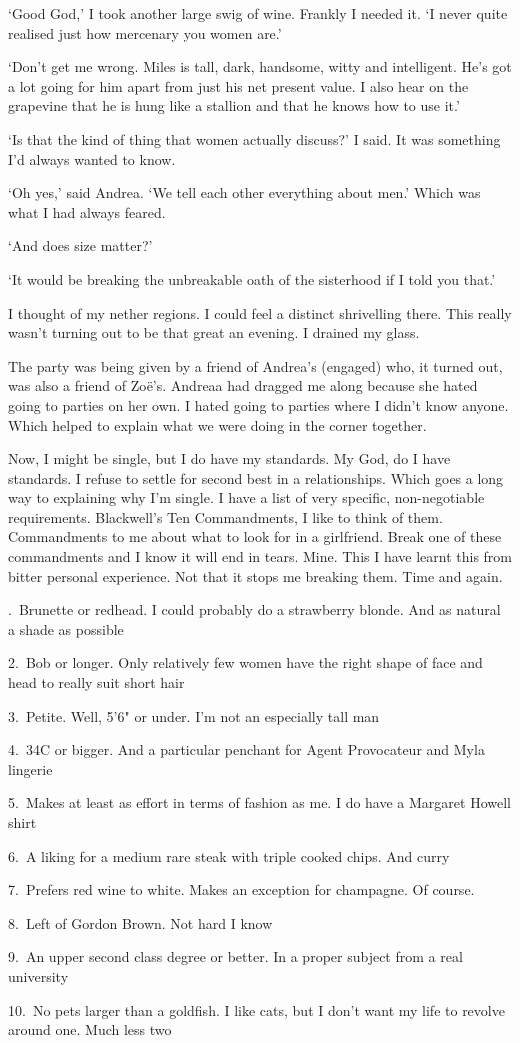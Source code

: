 `Good God,' I took another large swig of wine. Frankly I needed it.
`I never quite realised just how mercenary you women are.'

`Don't get me wrong. Miles is tall, dark, handsome,
witty and intelligent. He's got a lot going for him apart from just
his net present value. I also hear on the grapevine that he is hung
like a stallion {\twelveit and\/} that he knows how to use it.'

`Is that the kind of thing that women actually discuss?' I said. It was
something I'd always wanted to know.

`Oh yes,' said Andrea. `We tell each other {\twelveit everything\/} about
men.' Which was what I had always feared.

`And does size matter?'

`It would be breaking the unbreakable oath of the sisterhood if I told you that.'

I thought of my nether regions. I could feel
a distinct shrivelling there. This really wasn't turning out to be that great an
evening. I drained my glass.

The party was being given by a friend of Andrea's (engaged) who, it
turned out, was also a friend of Zo{\"e}'s. Andreaa had dragged me
along because she hated going to parties on her own. I hated going
to parties where I didn't know anyone. Which helped to explain what
we were doing in the corner together.

Now, I might be single, but I do have my standards. My God, do I
have standards. I refuse to settle for second best in a
relationships. Which goes a long way to explaining why I'm single. I
have a list of very specific, non-negotiable requirements.
Blackwell's Ten Commandments, I like to think of them. Commandments
to me about what to look for in a girlfriend. Break one of these
commandments and I know it will end in tears. Mine. This I have
learnt this from bitter personal experience. Not that it stops me
breaking them. Time and again.

{.~Brunette or redhead. I could probably do a strawberry blonde. And as natural a shade as
possible

2.~Bob or longer. Only relatively few women have the right shape of
face and head to really suit short hair

3.~Petite. Well, 5'6" or under. I'm not an especially tall man

4.~34C or bigger. And a particular penchant for Agent Provocateur and
Myla lingerie

5.~Makes at least as effort in terms of fashion as me. I do
have a Margaret Howell shirt

6.~A liking for a medium rare steak with triple cooked chips. And curry

7.~Prefers red wine to white. Makes an exception for champagne. Of course.

8.~Left of Gordon Brown. Not hard I know

9.~An upper second class degree or better. In a proper subject from a
real university

10.~No pets larger than a goldfish. I like cats, but I don't want my
life to revolve around one. Much less two}

